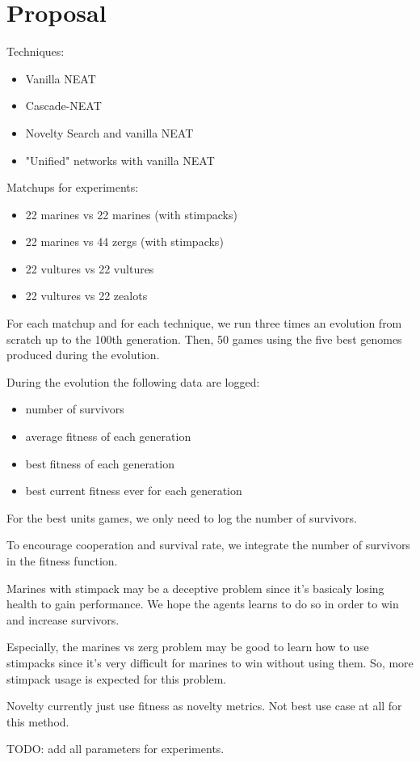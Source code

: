 \section{Proposal}\label{section:proposal}

Techniques:
\begin{itemize}
    \item Vanilla NEAT
    \item Cascade-NEAT
    \item Novelty Search and vanilla NEAT
    \item "Unified" networks with vanilla NEAT
\end{itemize}

Matchups for experiments:
\begin{itemize}
    \item 22 marines vs 22 marines (with stimpacks)
    \item 22 marines vs 44 zergs (with stimpacks)
    \item 22 vultures vs 22 vultures
    \item 22 vultures vs 22 zealots
\end{itemize}

For each matchup and for each technique, we run three times an evolution from scratch up to the 100th generation.
Then, 50 games using the five best genomes produced during the evolution.

During the evolution the following data are logged:
\begin{itemize}
    \item number of survivors
    \item average fitness of each generation
    \item best fitness of each generation
    \item best current fitness ever for each generation
\end{itemize}

For the best units games, we only need to log the number of survivors.

To encourage cooperation and survival rate, we integrate the number of survivors in the fitness function.

Marines with stimpack may be a deceptive problem since it's basicaly losing health to gain performance.
We hope the agents learns to do so in order to win and increase survivors.

Especially, the marines vs zerg problem may be good to learn how to use stimpacks since it’s very difficult
for marines to win without using them. So, more stimpack usage is expected for this problem.

Novelty currently just use fitness as novelty metrics. Not best use case at all for this method.

TODO: add all parameters for experiments.

